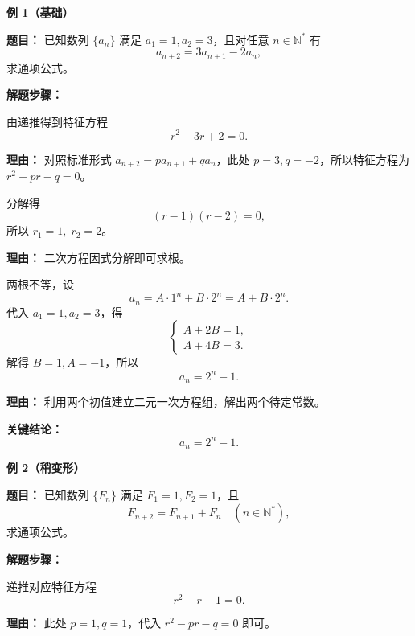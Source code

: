 \begin{examplebox}
	\textbf{\textcolor{CExample}{例 1（基础）}}

	\textbf{\textcolor{CExample}{题目：}}
	已知数列 \(\{a_n\}\) 满足 \(a_1=1,a_2=3\)，且对任意 \(n\in\mathbb N^*\) 有
	\[
		a_{n+2}=3a_{n+1}-2a_n,
	\]
	求通项公式。

	\textbf{\textcolor{CExample}{解题步骤：}}
	\begin{description}[style=nextline, leftmargin=2.8em, labelsep=0.5em, itemsep=0.45em]
		\item[\textbf{第一步（写特征方程）：}]
		      由递推得到特征方程
		      \[
			      r^2-3r+2=0.
		      \]
		      \par\textbf{理由：} 对照标准形式 \(a_{n+2}=p a_{n+1}+q a_n\)，此处 \(p=3,q=-2\)，所以特征方程为 \(r^2-pr-q=0\)。

		\item[\textbf{第二步（求特征根）：}]
		      分解得
		      \[
			      (r-1)(r-2)=0,
		      \]
		      所以 \(r_1=1,\;r_2=2\)。
		      \par\textbf{理由：} 二次方程因式分解即可求根。

		\item[\textbf{第三步（通项并定系数）：}]
		      两根不等，设
		      \[
			      a_n=A\cdot1^n+B\cdot2^n=A+B\cdot2^n.
		      \]
		      代入 \(a_1=1,a_2=3\)，得
		      \[
			      \begin{cases}
				      A+2B=1, \\
				      A+4B=3.
			      \end{cases}
		      \]
		      解得 \(B=1,A=-1\)，所以
		      \[
			      a_n=2^n-1.
		      \]
		      \par\textbf{理由：} 利用两个初值建立二元一次方程组，解出两个待定常数。
	\end{description}

	\textbf{\textcolor{CExample}{关键结论：}}
	\[
		\boxed{a_n=2^n-1}.
	\]

	\medskip
	\textbf{\textcolor{CExample}{例 2（稍变形）}}

	\textbf{\textcolor{CExample}{题目：}}
	已知数列 \(\{F_n\}\) 满足 \(F_1=1,F_2=1\)，且
	\[
		F_{n+2}=F_{n+1}+F_n\quad(n\in\mathbb N^*),
	\]
	求通项公式。

	\textbf{\textcolor{CExample}{解题步骤：}}
	\begin{description}[style=nextline, leftmargin=2.8em, labelsep=0.5em, itemsep=0.45em]
		\item[\textbf{第一步（写特征方程）：}]
		      递推对应特征方程
		      \[
			      r^2-r-1=0.
		      \]
		      \par\textbf{理由：} 此处 \(p=1,q=1\)，代入 \(r^2-pr-q=0\) 即可。


\end{description}
\end{examplebox}
